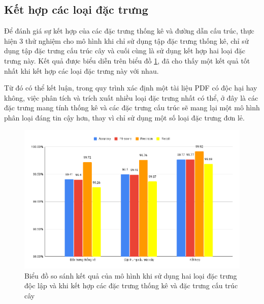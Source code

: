 \documentclass[./../main.tex]{subfiles}
\begin{document}
\subsection{Kết hợp các loại đặc trưng}

Để đánh giá sự kết hợp của các đặc trưng thống kê và đường dẫn cấu trúc, thực hiện 3 thử nghiệm cho mô hình khi chỉ sử dụng tập đặc trưng thống kê, chỉ sử dụng tập đặc trưng cấu trúc cây và cuối cùng là sử dụng kết hợp hai loại đặc trưng này. Kết quả được biểu diễn trên biểu đồ \ref{fig:exp1_compare_combination}, đã cho thấy một kết quả tốt nhất khi kết hợp các loại đặc trưng này với nhau.

Từ đó có thể kết luận, trong quy trình xác định một tài liệu PDF có độc hại hay không, việc phân tích và trích xuất nhiều loại đặc trưng nhất có thể, ở đây là các đặc trưng mang tính thống kê và các đặc trưng cấu trúc sẽ mang lại một mô hình phân loại đáng tin cậy hơn, thay vì chỉ sử dụng một số loại đặc trưng đơn lẻ.

\begin{figure}[H]
	\centering
	\includegraphics[width=\linewidth]{./images/exp1_compare_combination.png}
	\caption{Biểu đồ so sánh kết quả của mô hình khi sử dụng hai loại đặc trưng độc lập và khi kết hợp các đặc trưng thống kê và đặc trưng cấu trúc cây}
	\label{fig:exp1_compare_combination}
\end{figure}
\end{document}
